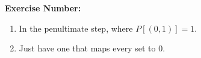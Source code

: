 \documentclass{article}
\begin{document}
\textbf{Exercise Number:   }  %

\medskip 

\noindent 

\begin{enumerate}

\item In the penultimate step, where $P[(0,1)] = 1$. 

\item Just have one that maps every set to 0. 

\end{enumerate}
\end{document}
